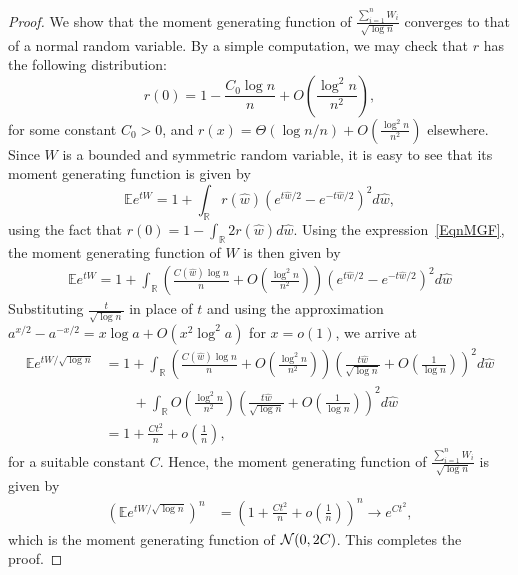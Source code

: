 \begin{proof}

We show that the moment generating function of $\frac{\sum_{i=1}^n W_i}{\sqrt{\log n}}$ converges to that of a normal random variable. By a simple computation, we may check that $r$ has the following distribution:
\begin{equation*}
r(0) = 1 - \frac{C_0\log n}{n} + O\left(\frac{\log^2 n}{n^2}\right),
\end{equation*}
for some constant $C_0 > 0$, and $r(x) = \Theta(\log n/n) + O\left(\frac{\log^2 n}{n^2}\right)$ elsewhere. Since $W$ is a bounded and symmetric random variable, it is easy to see that its moment generating function is given by
\begin{equation}
\label{EqnMGF}
\mathbb E e^{tW} = 1 + \int_{\mathbb R} r(\hat w)\left(e^{t\hat w/2} - e^{-t\hat w/2}\right)^2 d\hat w,
\end{equation}
using the fact that $r(0) = 1 - \int_{\mathbb R} 2r(\hat w)d\hat w$. Using the expression~\eqref{EqnMGF}, the moment generating function of $W$ is then given by
\begin{multline*}
\mathbb E e^{tW} = 1 + \int_{\mathbb R} \left(\frac{C(\hat w) \log n}{n} + O\left(\frac{\log^2 n}{n^2}\right)\right)\left(e^{t\hat w/2} - e^{-t\hat w/2}\right)^2 d\hat w
\end{multline*}
Substituting $\frac{t}{\sqrt{\log n}}$ in place of $t$ and using the approximation $a^{x/2} - a^{-x/2} = x\log a + O(x^2\log^2 a)$ for $x = o(1)$, we arrive at
\begin{align*}
\mathbb E e^{tW/\sqrt{ \log n}} &=  1 + \int_{\mathbb R} \left(\frac{C(\hat w) \log n}{n} + O\left(\frac{\log^2 n}{n^2}\right)\right) \left(\frac{t\hat w}{\sqrt {\log n}} + O\left(\frac{1}{\log n}\right)\right)^2 d\hat w\\
%
& \qquad + \int_{\mathbb R} O\left(\frac{\log^2 n}{n^2} \right)\left(\frac{t\hat w}{\sqrt {\log n}} + O\left(\frac{1}{\log n}\right)\right)^2d\hat w\\
%
%
%
&= 1 + \frac{Ct^2}{n} + o\left(\frac{1}{n}\right),
\end{align*}
for a suitable constant $C$. Hence, the moment generating function of $\frac{\sum_{i=1}^n W_i}{\sqrt{\log n}}$ is given by
\begin{align*}
\left(\mathbb E e^{tW/\sqrt{ \log n}}\right)^n &= \left(1 + \frac{Ct^2}{n} + o\left(\frac{1}{n}\right)\right)^n \longrightarrow e^{Ct^2},
\end{align*}
which is the moment generating function of ${\mathcal N}(0, 2C)$. This completes the proof.

\end{proof}



